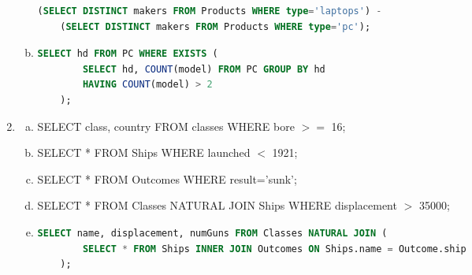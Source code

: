 \documentclass[12pt]{article}
\begin{document}
\begin{enumerate}[1.]
\begin{enumerate}[a)]
    \begin{lstlisting}[language=SQL]
    (SELECT DISTINCT makers FROM Products WHERE type='laptops') -
    (SELECT DISTINCT makers FROM Products WHERE type='pc');
    \end{lstlisting}

        \item

    \begin{lstlisting}[language=SQL]
    SELECT hd FROM PC WHERE EXISTS (
        SELECT hd, COUNT(model) FROM PC GROUP BY hd
        HAVING COUNT(model) > 2
    );
    \end{lstlisting}
    \end{enumerate}

    \item

    \begin{enumerate}[a)]
        \item SELECT class, country FROM classes WHERE bore $>=$ 16;
        \item SELECT * FROM Ships WHERE launched $<$ 1921;
        \item SELECT * FROM Outcomes WHERE result='sunk';
        \item SELECT * FROM Classes NATURAL JOIN Ships WHERE displacement $>$ 35000;
        \item
    \begin{lstlisting}[language=SQL]
    SELECT name, displacement, numGuns FROM Classes NATURAL JOIN (
        SELECT * FROM Ships INNER JOIN Outcomes ON Ships.name = Outcome.ship
    );
    \end{lstlisting}
    \end{enumerate}
\end{enumerate}
\end{document}
